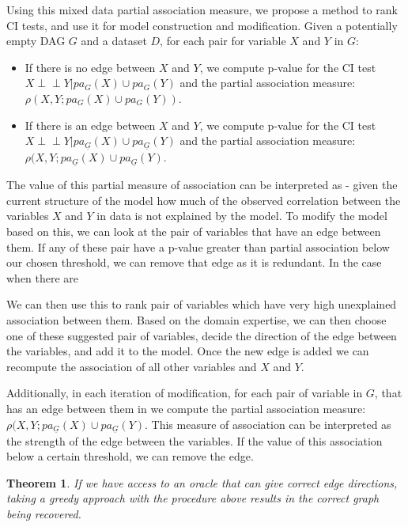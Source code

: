 \documentclass[letterpaper]{article} %
\def\ci{\perp\!\!\!\!\!\perp}
\newtheorem{theorem}{Theorem}
\begin{document}

Using this mixed data partial association measure, we propose a method to rank
CI tests, and use it for model construction and modification. Given a
potentially empty DAG $ G $ and a dataset $ D $, for each pair for variable $ X
$ and $ Y $ in $ G $:
\begin{itemize}
	\item If there is no edge between $ X $ and $ Y $, we compute p-value for the CI test $ X \ci Y \rvert pa_G(X) \cup pa_G(Y) $ and the partial association measure: $ \rho(X, Y; pa_G(X) \cup pa_G(Y)) $.
	\item If there is an edge between $ X $ and $ Y $, we compute p-value for the CI test $ X \ci Y \rvert pa_{\underline{G}}(X) \cup pa_{\underline{G}}(Y) $ and the partial association measure: $ \rho(X, Y; pa_{\underline{G}}(X) \cup pa_{\underline{G}}(Y) $.
\end{itemize}

The value of this partial measure of association can be interpreted as - given
the current structure of the model how much of the observed correlation between
the variables $ X $ and $ Y $ in data is not explained by the model. To modify
the model based on this, we can look at the pair of variables that have an edge
between them. If any of these pair have a p-value greater than partial
association below our chosen threshold, we can remove that edge as it is
redundant. In the case when there are 

We can then use this to rank pair of variables which have very high unexplained
association between them. Based on the domain expertise, we can then choose one
of these suggested pair of variables, decide the direction of the edge between
the variables, and add it to the model. Once the new edge is added we can
recompute the association of all other variables and $ X $ and $ Y $.

Additionally, in each iteration of modification, for each pair of variable in $
G $, that has an edge between them in we compute the partial association
measure: $ \rho(X, Y; pa_{\underline{G}}(X) \cup pa_{\underline{G}}(Y) $. This
measure of association can be interpreted as the strength of the edge between
the variables. If the value of this association below a certain threshold, we
can remove the edge.

\begin{theorem}
	If we have access to an oracle that can give correct edge directions, taking a
	greedy approach with the procedure above results in the correct graph
	being recovered. 
\end{theorem}
\end{document}
